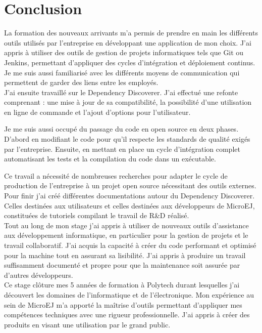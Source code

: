\documentclass[french,a4paper,12pt]{report}
\begin{document}
\chapter{Conclusion}

La formation des nouveaux arrivants m'a permis de prendre en main les différents outils utilisés par l'entreprise en développant une application de mon choix. J'ai appris à utiliser des outils de gestion de projets informatiques tels que Git ou Jenkins, permettant d'appliquer des cycles d'intégration et déploiement continus.
Je me suis aussi familiarisé avec les différents moyens de communication qui permettent de garder des liens entre les employés.\\

J'ai ensuite travaillé sur le Dependency Discoverer. J'ai effectué une refonte comprenant : une mise à jour de sa compatibilité, la possibilité d'une utilisation en ligne de commande et l'ajout d'options pour l’utilisateur. 

Je me suis aussi occupé du passage du code en open source en deux phases. D'abord en modifiant le code pour qu'il respecte les standards de qualité exigés par l'entreprise. Ensuite, en mettant en place un cycle d'intégration complet automatisant les tests et la compilation du code dans un exécutable. 

Ce travail a nécessité de nombreuses recherches pour adapter le cycle de production de l'entreprise à un projet open source nécessitant des outils externes.\\

Pour finir j'ai créé différentes documentations autour du Dependency Discoverer. Celles destinées aux utilisateurs et celles destinées aux développeurs de MicroEJ, constituées de tutoriels compilant le travail de R\&D réalisé.\\

Tout au long de mon stage j’ai appris à utiliser de nouveaux outils d’assistance aux développement informatique, en particulier pour la gestion de projets et le travail collaboratif. J'ai acquis la capacité à créer du code performant et optimisé pour la machine tout en assurant sa lisibilité. J'ai appris à produire un travail suffisamment documenté et propre pour que la maintenance soit assurée par d'autres développeurs.\\

Ce stage clôture mes 5 années de formation à Polytech durant lesquelles j'ai découvert les domaines de l'informatique et de l'électronique. 
Mon expérience au sein de MicroEJ m’a apporté la maîtrise d'outils permettant d'appliquer mes compétences techniques avec une rigueur professionnelle. J'ai appris à créer des produits en visant une utilisation par le grand public.\\ 
\end{document}
